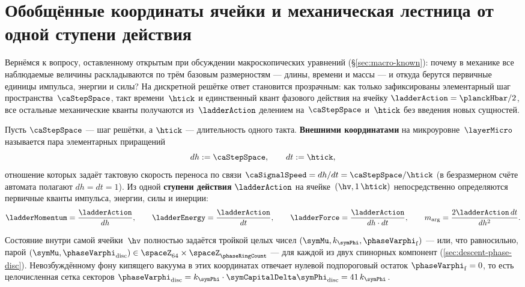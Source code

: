 \section{Обобщённые координаты ячейки и механическая лестница от одной ступени действия}
\label{sec:coords-dh-dt}
\label{ch:native-coords}

Вернёмся к вопросу, оставленному открытым при обсуждении макроскопических уравнений (§\ref{sec:macro-known}):
почему в механике все наблюдаемые величины раскладываются по трём базовым размерностям --- длины, времени и массы --- и откуда берутся первичные единицы импульса, энергии и силы?
На дискретной решётке ответ становится прозрачным: как только зафиксированы элементарный шаг пространства~$\caStepSpace$, такт времени~$\htick$ и единственный квант фазового действия на ячейку $\ladderAction = \planckHbar/2$, все остальные механические кванты получаются из~$\ladderAction$ делением на~$\caStepSpace$ и~$\htick$ без введения новых сущностей.

\begin{definition}
\label{def:dh-dt}
Пусть $\caStepSpace$ --- шаг решётки, а $\htick$ --- длительность одного такта.
\textbf{Внешними координатами} на микроуровне~$\layerMicro$ называется пара элементарных приращений
\[
  dh := \caStepSpace,\qquad dt := \htick,
\]
отношение которых задаёт тактовую скорость переноса по связи $\caSignalSpeed = dh/dt = \caStepSpace/\htick$ (в безразмерном счёте автомата полагают $dh = dt = 1$).
Из одной \textbf{ступени действия} $\ladderAction$ на ячейке~$(\hv, 1\,\htick)$ непосредственно определяются первичные кванты импульса, энергии, силы и инерции:
\[
  \ladderMomentum = \frac{\ladderAction}{dh},\qquad
  \ladderEnergy = \frac{\ladderAction}{dt},\qquad
  \ladderForce = \frac{\ladderAction}{dh\cdot dt},\qquad
  m_{\arg} = \frac{2\ladderAction\,dt}{dh^2}.
\]
\end{definition}

\begin{definition}
\label{def:internal-coords}
Состояние внутри самой ячейки~$\hv$ полностью задаётся тройкой целых чисел $(\symMu, k_{\symPhi}, \phaseVarphi_{\mathrm{f}})$ --- или, что равносильно, парой $(\symMu, \phaseVarphi_{\mathrm{disc}})\in\spaceZ_{64}\times\spaceZ_{\phaseRingCount}$ --- для каждой из двух спинорных компонент (\cref{sec:descent-phase-disc}).
Невозбуждённому фону кипящего вакуума в этих координатах отвечает нулевой подпороговый остаток $\phaseVarphi_{\mathrm{f}} = 0$, то есть целочисленная сетка секторов $\phaseVarphi_{\mathrm{disc}} = k_{\symPhi}\cdot\symCapitalDelta\symPhi_{\mathrm{disc}} = 41\,k_{\symPhi}$.
\end{definition}

